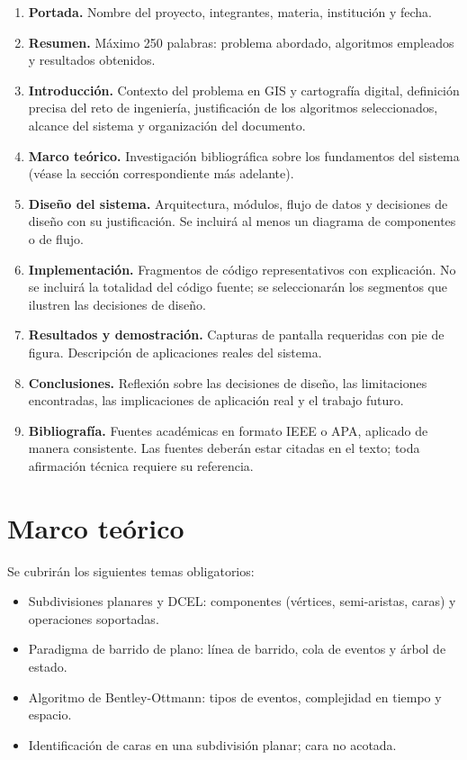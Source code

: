 \documentclass[11pt]{article}
\begin{document}
\begin{enumerate}
  \item \textbf{Portada.} Nombre del proyecto, integrantes, materia, institución
        y fecha.
  \item \textbf{Resumen.} Máximo 250 palabras: problema abordado, algoritmos
        empleados y resultados obtenidos.
  \item \textbf{Introducción.} Contexto del problema en GIS y cartografía digital,
        definición precisa del reto de ingeniería, justificación de los algoritmos
        seleccionados, alcance del sistema y organización del documento.
  \item \textbf{Marco teórico.} Investigación bibliográfica sobre los fundamentos
        del sistema (véase la sección correspondiente más adelante).
  \item \textbf{Diseño del sistema.} Arquitectura, módulos, flujo de datos y
        decisiones de diseño con su justificación.  Se incluirá al menos un
        diagrama de componentes o de flujo.
  \item \textbf{Implementación.} Fragmentos de código representativos con
        explicación.  No se incluirá la totalidad del código fuente; se
        seleccionarán los segmentos que ilustren las decisiones de diseño.
  \item \textbf{Resultados y demostración.} Capturas de pantalla requeridas con
        pie de figura.  Descripción de aplicaciones reales del sistema.
  \item \textbf{Conclusiones.} Reflexión sobre las decisiones de diseño, las
        limitaciones encontradas, las implicaciones de aplicación real y el
        trabajo futuro.
  \item \textbf{Bibliografía.} Fuentes académicas en formato IEEE o APA, aplicado
        de manera consistente.  Las fuentes deberán estar citadas en el texto;
        toda afirmación técnica requiere su referencia.
\end{enumerate}

\section*{Marco teórico}

Se cubrirán los siguientes temas obligatorios:

\begin{itemize}
  \item Subdivisiones planares y DCEL: componentes (vértices, semi-aristas,
        caras) y operaciones soportadas.
  \item Paradigma de barrido de plano: línea de barrido, cola de eventos y
        árbol de estado.
  \item Algoritmo de Bentley-Ottmann: tipos de eventos, complejidad en tiempo
        y espacio.
  \item Identificación de caras en una subdivisión planar; cara no acotada.
\end{itemize}
\end{document}
